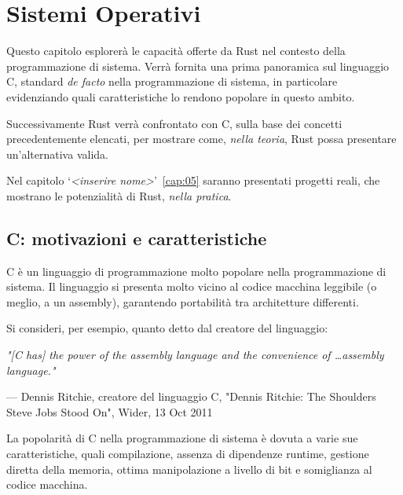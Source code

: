 
\chapter{Sistemi Operativi}\label{cap:04}

Questo capitolo esplorerà le capacità offerte da Rust nel 
contesto della programmazione di sistema. Verrà fornita una 
prima panoramica sul linguaggio C, standard \textit{de facto}
nella programmazione di sistema, in particolare evidenziando 
quali caratteristiche lo rendono popolare in questo ambito.

Successivamente Rust verrà confrontato con C, sulla base dei 
concetti precedentemente elencati, per mostrare come, 
\textit{nella teoria}, Rust possa presentare un'alternativa valida.

Nel capitolo `\textit{<inserire nome>}'~\ref{cap:05} saranno 
presentati progetti reali, che mostrano le potenzialità di Rust, 
\textit{nella pratica}.


\section{C: motivazioni e caratteristiche}
C è un linguaggio di programmazione molto popolare nella programmazione
di sistema. Il linguaggio si presenta molto vicino al codice macchina
leggibile (o meglio, a un assembly), garantendo portabilità tra 
architetture differenti.

Si consideri, per esempio, quanto detto dal creatore del linguaggio:
\begin{center}
    \begin{minipage}{0.9\textwidth}
        \vspace{0.5em}
        \itshape "[C has] the power of the assembly language and the convenience of \ldots assembly language."

        \hfill --- Dennis Ritchie, creatore del linguaggio C, "Dennis Ritchie: The Shoulders Steve Jobs Stood On", Wider, 13 Oct 2011
        \vspace{0.4em}
    \end{minipage}
\end{center}

\noindent La popolarità di C nella programmazione di sistema è dovuta a varie sue caratteristiche, quali 
compilazione, assenza di dipendenze runtime, gestione diretta della
 memoria, ottima manipolazione a livello di bit e somiglianza al 
 codice macchina.
